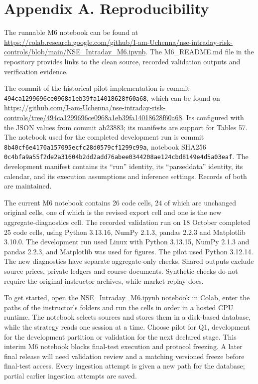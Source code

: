 \documentclass[11pt,a4paper]{article}
\begin{document}
\section*{Appendix A. Reproducibility}

The runnable M6 notebook can be found at \url{https://colab.research.google.com/github/I-am-Uchenna/nse-intraday-risk-controls/blob/main/NSE_Intraday_M6.ipynb}. The M6\_README.md file in the repository provides links to the clean source, recorded validation outputs and verification evidence.

The commit of the historical pilot implementation is commit \nolinkurl{494ca1299696ce0968a1eb39fa14018628f60a68}, which can be found on \url{https://github.com/I-am-Uchenna/nse-intraday-risk-controls/tree/494ca1299696ce0968a1eb39fa14018628f60a68}. Its configured with the JSON values from commit ab23883; its manifests are support for Tables 5\allowbreak{}7. The notebook used for the completed development run is commit \nolinkurl{8b40cf6e4170a157095ecfc28d0579cf1299c99a}, notebook SHA\allowbreak{}256 \nolinkurl{0c4bfa9a55f2de2a31604b2dd2add76abee0344208ae124cbd8149e4d5a03eaf}. The development manifest contains its “run” identity, its “parsed\allowbreak{}data” identity, its calendar, and its execution assumptions and inference settings. Records of both are maintained.

The current M6 notebook contains 26 code cells, 24 of which are unchanged original cells, one of which is the revised export cell and one is the new aggregate-diagnostics cell. The recorded validation run on 18 October completed 25 code cells, using Python 3.13.16, NumPy 2.1.3, pandas 2.2.3 and Matplotlib 3.10.0. The development run used Linux with Python 3.13.15, NumPy 2.1.3 and pandas 2.2.3, and Matplotlib was used for figures. The pilot used Python 3.12.14. The new diagnostics have separate aggregate-only checks. Shared outputs exclude source prices, private ledgers and course documents. Synthetic checks do not require the original instructor archives, while market replay does.

To get started, open the NSE\_Intraday\_M6.ipynb notebook in Colab, enter the paths of the instructor's folders and run the cells in order in a hosted CPU runtime. The notebook selects sources and stores them in a disk-based database, while the strategy reads one session at a time. Choose pilot for Q1, development for the development partition or validation for the next declared stage. This interim M6 notebook blocks final-test execution and protocol freezing. A later final release will need validation review and a matching versioned freeze before final-test access. Every ingestion attempt is given a new path for the database; partial earlier ingestion attempts are saved.
\end{document}
